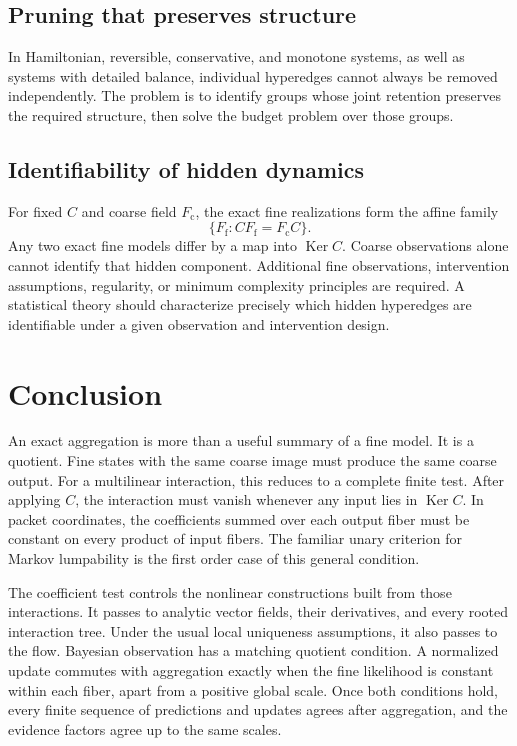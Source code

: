 \documentclass[11pt]{article}
\theoremstyle{definition}
\theoremstyle{remark}
\newcommand{\Ker}{\operatorname{Ker}}
\newcommand{\fine}{\mathrm f}
\newcommand{\coarse}{\mathrm c}
\begin{document}
\subsection{Pruning that preserves structure}
In Hamiltonian, reversible, conservative, and monotone systems, as well as systems with detailed balance, individual hyperedges cannot always be removed independently.  The problem is to identify groups whose joint retention preserves the required structure, then solve the budget problem over those groups.

\subsection{Identifiability of hidden dynamics}
For fixed $C$ and coarse field $F_{\coarse}$, the exact fine realizations form the affine family
\[
  \{F_{\fine}:CF_{\fine}=F_{\coarse}C\}.
\]
Any two exact fine models differ by a map into $\Ker C$.  Coarse observations alone cannot identify that hidden component.  Additional fine observations, intervention assumptions, regularity, or minimum complexity principles are required.  A statistical theory should characterize precisely which hidden hyperedges are identifiable under a given observation and intervention design.

\section{Conclusion}
An exact aggregation is more than a useful summary of a fine model.  It is a quotient.  Fine states with the same coarse image must produce the same coarse output.  For a multilinear interaction, this reduces to a complete finite test.  After applying $C$, the interaction must vanish whenever any input lies in $\Ker C$.  In packet coordinates, the coefficients summed over each output fiber must be constant on every product of input fibers.  The familiar unary criterion for Markov lumpability is the first order case of this general condition.

The coefficient test controls the nonlinear constructions built from those interactions.  It passes to analytic vector fields, their derivatives, and every rooted interaction tree.  Under the usual local uniqueness assumptions, it also passes to the flow.  Bayesian observation has a matching quotient condition.  A normalized update commutes with aggregation exactly when the fine likelihood is constant within each fiber, apart from a positive global scale.  Once both conditions hold, every finite sequence of predictions and updates agrees after aggregation, and the evidence factors agree up to the same scales.
\end{document}
